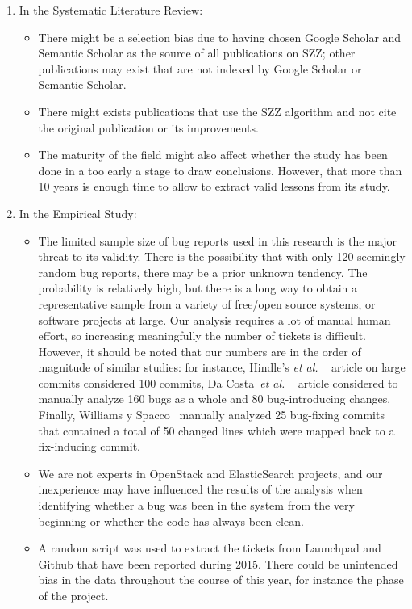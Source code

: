\documentclass[a4paper, 12pt]{book}
\begin{document}
\begin{enumerate}
	\item In the Systematic Literature Review: 
		\begin{itemize}
   		 	\item  There might be a selection bias due to having chosen Google Scholar and Semantic Scholar as the source of all publications on SZZ; other publications may exist that are not indexed by Google Scholar or Semantic Scholar. 
    			\item  There might exists publications that use the SZZ algorithm and not cite the original publication or its improvements. 
    		 	\item The maturity of the field might also affect whether the study has been done in a too early a stage to draw conclusions. However, that more than 10 years is enough time to allow to extract valid lessons from its study.
		\end{itemize}
	\item {In the Empirical Study}: 
		\begin{itemize}
   			\item The limited sample size of bug reports used in this research is the major threat to its validity. There is the possibility that with only 120 seemingly random bug reports, there may be a prior unknown tendency. The probability is relatively high, but there is a long way to obtain a representative sample from a variety of free/open source systems, or software projects at large. Our analysis requires a lot of manual human effort, so increasing meaningfully the number of tickets is difficult. However, it should be noted that our numbers are in the order of magnitude of similar studies: for instance, Hindle's \emph{et al.} ~\cite{hindle2008large} article on large commits considered 100 commits, Da Costa~\textit{et al.} ~\cite{da2016framework} article considered to manually analyze 160 bugs as a whole and 80 bug-introducing changes. Finally, Williams y Spacco~\cite{williams2008szz} manually analyzed 25 bug-fixing commits that contained a total of 50 changed lines which were mapped back to a fix-inducing commit.
			\item We are not experts in OpenStack and ElasticSearch projects, and our inexperience may have influenced the results of the analysis when identifying whether a bug was been in the system from the very beginning or whether the code has always been clean. 
			\item A random script was used to extract the tickets from Launchpad and Github that have been reported during 2015. There could be unintended bias in the data throughout the course of this year, for instance the phase of the project.

\end{itemize}
\end{enumerate}
\end{document}
